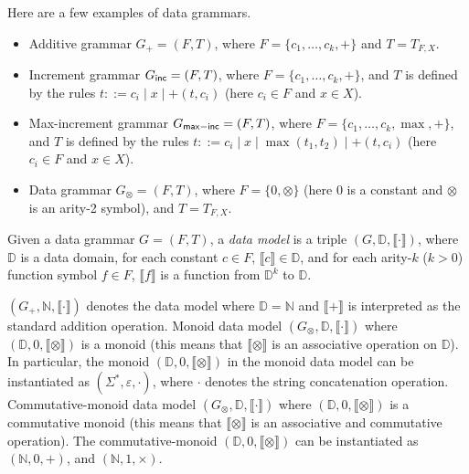 \documentclass[runningheads,a4paper]{llncs}
\newcommand\dd{\mathbb{D}}
\newcommand\nat{\mathbb{N}}
\begin{document}
\begin{example}
Here are a few examples of data grammars.
\begin{itemize}
\item Additive grammar $G_+=(F, T)$, where $F=\{c_1,\dots, c_k, +\}$ and $T=T_{F,X}$. 

\item Increment grammar $G_{\sf inc} = (F, T)$, where $F=\{c_1,\dots, c_k, +\}$, and $T$ is defined by the rules $t ::= c_i \mid x \mid +(t, c_i)$ (here $c_i \in F$ and $x \in X$). 

\item Max-increment grammar $G_{\sf max-inc} = (F, T)$, where $F=\{c_1,\dots, c_k, \max, +\}$, and $T$ is defined by the rules $t ::= c_i \mid x \mid \max(t_1, t_2) \mid +(t,c_i)$ (here $c_i \in F$ and $x \in X$). 

\item Data grammar $G_\otimes = (F,T)$, where $F=\{0, \otimes\}$ (here $0$ is a constant and $\otimes$ is an arity-2 symbol), and $T=T_{F,X}$. 
\end{itemize}
\end{example}

Given a data grammar $G=(F, T)$, a \emph{data model} is a triple $(G, \dd, \llbracket \cdot \rrbracket)$, where $\dd$ is a data domain,  for each constant $c \in F$, $\llbracket c\rrbracket \in \dd$, and for each arity-$k$ ($k > 0$) function symbol $f \in F$, $\llbracket f \rrbracket $ is a function from $\dd^k$ to $\dd$. 

\begin{example}
$(G_+, \nat, \llbracket \cdot \rrbracket)$ denotes the data model where $\dd=\nat$ and $\llbracket + \rrbracket$ is interpreted as the standard addition operation. Monoid data model $(G_\otimes, \dd, \llbracket \cdot \rrbracket)$ where $(\dd, 0, \llbracket \otimes \rrbracket)$ is a monoid (this means that $ \llbracket \otimes \rrbracket$ is an associative operation on $\dd$). In particular, the monoid $(\dd, 0, \llbracket \otimes \rrbracket)$ in the monoid data model can be instantiated as $(\Sigma^\ast, \varepsilon, \cdot)$, where $\cdot$ denotes the string concatenation operation. Commutative-monoid data model $(G_\otimes, \dd, \llbracket \cdot \rrbracket)$ where $(\dd, 0, \llbracket \otimes \rrbracket)$ is a commutative monoid (this means that $\llbracket \otimes \rrbracket$ is an associative and commutative operation). The commutative-monoid  $(\dd, 0, \llbracket \otimes \rrbracket)$ can be instantiated as $(\nat, 0, +)$, and $(\nat, 1, \times)$. 
\end{example}
\end{document}
